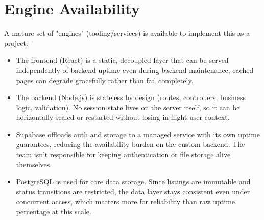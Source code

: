 \documentclass[12pt,a4paper]{article}
\begin{document}
\section{Engine Availability}
A mature set of "engines" (tooling/services) is available to implement this as a project:-
\begin{itemize}[leftmargin=0.7cm]
    \item The frontend (React) is a static, decoupled layer that can be served independently of backend uptime even during backend maintenance, cached pages can degrade gracefully rather than fail completely.
    \item The backend (Node.js) is stateless by design (routes, controllers, business logic, validation). No session state lives on the server itself, so it can be horizontally scaled or restarted without losing in-flight user context.
    \item Supabase offloads auth and storage to a managed service with its own uptime guarantees, reducing the availability burden on the custom backend. The team isn't responsible for keeping authentication or file storage alive themselves.
    \item PostgreSQL is used for core data storage. Since listings are immutable and status transitions are restricted, the data layer stays consistent even under concurrent access, which matters more for reliability than raw uptime percentage at this scale.
\end{itemize}
\end{document}
